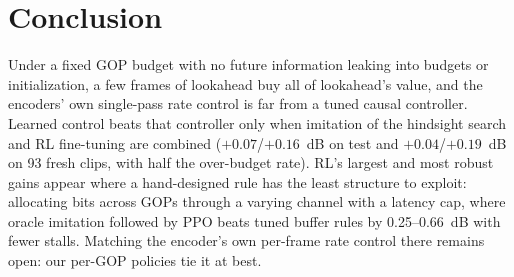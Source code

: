 \documentclass[conference]{IEEEtran}
\begin{document}
\section{Conclusion}
Under a fixed GOP budget with no future information leaking into budgets or initialization, a few frames of lookahead buy all of lookahead's value, and the encoders' own single-pass rate control is far from a tuned causal controller. Learned control beats that controller only when imitation of the hindsight search and RL fine-tuning are combined ($+0.07$/$+0.16$~dB on test and $+0.04$/$+0.19$~dB on 93 fresh clips, with half the over-budget rate). RL's largest and most robust gains appear where a hand-designed rule has the least structure to exploit: allocating bits across GOPs through a varying channel with a latency cap, where oracle imitation followed by PPO beats tuned buffer rules by 0.25--0.66~dB with fewer stalls. Matching the encoder's own per-frame rate control there remains open: our per-GOP policies tie it at best.
\end{document}
